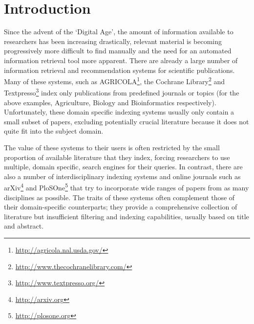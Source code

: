 \documentclass{svmult}
\begin{document}
\section{Introduction} \label{sec:1}

Since the advent of the `Digital Age', the amount of information available to
researchers has been increasing drastically, relevant material is becoming
progressively more difficult to find manually and the need for an automated
information retrieval tool more apparent. There are already a large number of
information retrieval and recommendation systems for scientific publications.
Many of these systems, such as
AGRICOLA\footnote{\url{http://agricola.nal.usda.gov/}}, the Cochrane
Library\footnote{\url{http://www.thecochranelibrary.com/}} and
Textpresso\footnote{\url{http://www.textpresso.org/}} index only publications
from predefined journals or topics (for the above examples, Agriculture,
Biology and Bioinformatics respectively).  Unfortunately, these domain specific
indexing systems usually only contain a small subset of papers, excluding
potentially crucial literature because it does not quite fit into the subject
domain. 

The value of these systems to their users is often restricted by the small
proportion of available literature that they index, forcing researchers to use
multiple, domain specific, search engines for their queries.  In contrast,
there are also a number of interdisciplinary indexing systems and online
journals such as arXiv\footnote{\url{http://arxiv.org}} and
PloSOne\footnote{\url{http://plosone.org}} that try to incorporate wide ranges
of papers from as many disciplines as possible. The traits of these systems
often complement those of their domain-specific counterparts; they provide a
comprehensive collection of literature but insufficient filtering and indexing
capabilities, usually based on title and abstract. 
\end{document}
